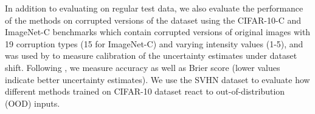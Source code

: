 \documentclass{article}
\begin{document}
 In addition to evaluating on regular test data, we also evaluate the performance of the methods on corrupted versions of the dataset using the CIFAR-10-C and ImageNet-C benchmarks  \citep{hendrycks2018benchmarking} which contain corrupted versions of original images with 19 corruption types (15 for ImageNet-C) and varying intensity values (1-5), and was used by \citet{ovadia2019can} to measure calibration of the uncertainty estimates under dataset shift. Following \citet{ovadia2019can}, we measure  accuracy as well as Brier score \citep{brier1950verification} (lower values indicate better uncertainty estimates). %
 {We use the SVHN dataset \citep{svhn} to evaluate how different methods trained on CIFAR-10 dataset react to out-of-distribution (OOD) inputs.}

%


 
 
\end{document}
